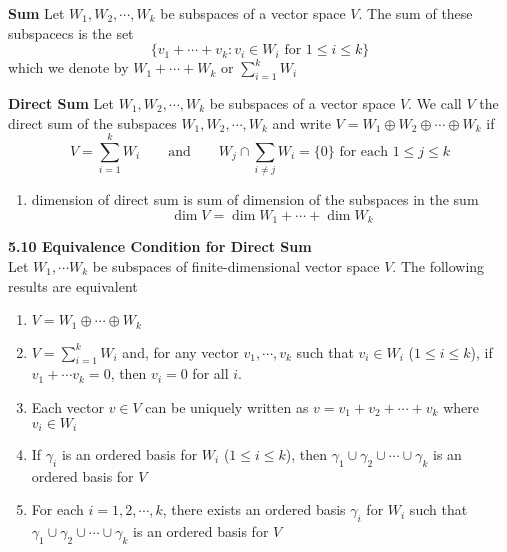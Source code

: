 \documentclass[11pt]{article}
\begin{document}
\begin{defn*}
    \textbf{Sum} Let $W_1, W_2,\cdots, W_k$ be subspaces of a vector space $V$. The sum of these subspacecs is the set 
    \[
        \{v_1 + \cdots + v_k : v_i \in W_i \text{ for } 1 \leq i \leq k\}    
    \]
    which we denote by $W_1 + \cdots + W_k$ or $\textstyle\sum_{i=1}^k W_i$
\end{defn*}

\begin{defn*}
    \textbf{Direct Sum} Let $W_1, W_2, \cdots, W_k$ be subspaces of a vector space $V$. We call $V$ the direct sum of the subspaces $W_1, W_2, \cdots, W_k$ and write $V = W_1 \oplus W_2 \oplus \cdots \oplus W_k$ if 
    \[
        V = \sum_{i=1}^k W_i    
        \qquad \text{and} \qquad 
        W_j \cap \sum_{i\neq j} W_i = \{ 0\} \text{ for each } 1 \leq j \leq k
    \]
    \begin{enumerate}
        \item dimension of direct sum is sum of dimension of the subspaces in the sum
        \[
            \dim{V} = \dim{W_1} + \cdots + \dim{W_k}
        \]
    \end{enumerate}
\end{defn*}


\begin{theorem*}
    \textbf{5.10 Equivalence Condition for Direct Sum} \\
    Let $W_1, \cdots W_k$ be subspaces of finite-dimensional vector space $V$. The following results are equivalent
    \begin{enumerate}
        \item $V = W_1 \oplus \cdots \oplus W_k$ 
        \item $V = \textstyle\sum_{i=1}^k W_i$ and, for any vector $v_1, \cdots, v_k$ such that $v_i \in W_i$ ($1\leq i \leq k$), if $v_1 + \cdots v_k = 0$, then $v_i = 0$ for all $i$.
        \item Each vector $v\in V$ can be uniquely written as $v = v_1 + v_2 + \cdots + v_k$ where $v_i \in W_i$ 
        \item If $\gamma_i$ is an ordered basis for $W_i$ ($1\leq i \leq k$), then $\gamma_1 \cup \gamma_2 \cup \cdots \cup \gamma_k$ is an ordered basis for $V$
        \item For each $i = 1,2,\cdots, k$, there exists an ordered basis $\gamma_i$ for $W_i$ such that $\gamma_1 \cup \gamma_2 \cup\cdots \cup \gamma_k$ is an ordered basis for $V$ 
    \end{enumerate}
\end{theorem*}
\end{document}
